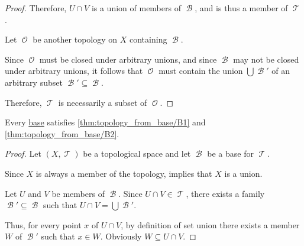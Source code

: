 \begin{proof}
  Therefore, \( U \cap V \) is a union of members of \( \mscrB \), and is thus a member of \( \mscrT \).

   Let \( \mscrO \) be another topology on \( X \) containing \( \mscrB \).

  Since \( \mscrO \) must be closed under arbitrary unions, and since \( \mscrB \) may not be closed under arbitrary unions, it follows that \( \mscrO \) must contain the union \( \bigcup \mscrB' \) of an arbitrary subset \( \mscrB' \subseteq \mscrB \).

  Therefore, \( \mscrT \) is necessarily a subset of \( \mscrO \).
\end{proof}

\begin{proposition}\label{thm:base_can_generate_topology}
  Every \hyperref[def:topological_base]{base} satisfies \ref{thm:topology_from_base/B1} and \ref{thm:topology_from_base/B2}.
\end{proposition}
\begin{proof}
  Let \( (X, \mscrT) \) be a topological space and let \( \mscrB \) be a base for \( \mscrT \).

   Since \( X \) is always a member of the topology,  implies that \( X \) is a union.

   Let \( U \) and \( V \) be members of \( \mscrB \). Since \( U \cap V \in \mscrT \), there exists a family \( \mscrB' \subseteq \mscrB \) such that \( U \cap V = \bigcup \mscrB' \).

  Thus, for every point \( x \) of \( U \cap V \), by definition of set union there exists a member \( W \) of \( \mscrB' \) such that \( x \in W \). Obviously \( W \subseteq U \cap V \).
\end{proof}

